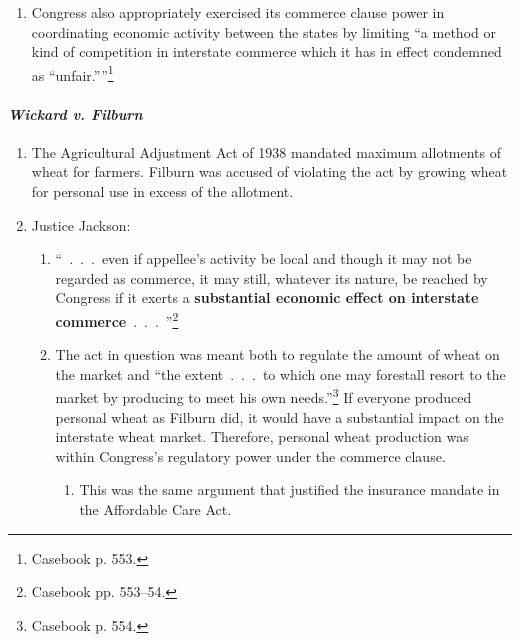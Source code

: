 \begin{enumerate}
\begin{enumerate}
        the prohibited product, but also to ``stop the initial step toward 
        transportation, production with the purpose of so transporting 
        it.''\footnote{Casebook p. 552.} Such regulation was within Congress's 
        power.
        \item Congress also appropriately exercised its commerce clause power 
        in coordinating economic activity between the states by limiting ``a 
        method or kind of competition in interstate commerce which it has in 
        effect condemned as \enquote{unfair.}''\footnote{Casebook p. 553.}
    \end{enumerate}
\end{enumerate}

\paragraph{\emph{Wickard v. Filburn}}

\begin{enumerate}
    \item The Agricultural Adjustment Act of 1938 mandated maximum allotments 
    of wheat for farmers. Filburn was accused of violating the act by growing 
    wheat for personal use in excess of the allotment.
    \item Justice Jackson:
    \begin{enumerate}
        \item ``~.~.~.~even if appellee's activity be local and though it may 
        not be regarded as commerce, it may still, whatever its nature, be 
        reached by Congress if it exerts a \textbf{substantial economic effect 
        on interstate commerce}~.~.~.~''\footnote{Casebook pp. 553--54.}
        \item The act in question was meant both to regulate the amount of 
        wheat on the market and ``the extent~.~.~.~to which one may forestall 
        resort to the market by producing to meet his own 
        needs.''\footnote{Casebook p. 554.} If everyone produced personal 
        wheat as Filburn did, it would have a substantial impact on the 
        interstate wheat market. Therefore, personal wheat production was 
        within Congress's regulatory power under the commerce clause.
        \begin{enumerate}
            \item This was the same argument that justified the insurance 
            mandate in the Affordable Care Act.
        \end{enumerate}
    \end{enumerate}
\end{enumerate}

